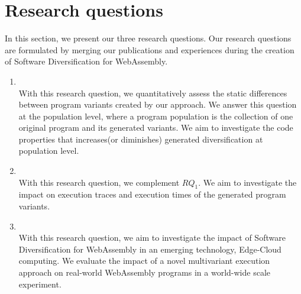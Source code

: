 

\section{Research questions}
\label{intro:definition:rq}

In this section, we present our three research questions. Our research questions are formulated by merging our publications and experiences during the creation of Software Diversification for WebAssembly. 

\begin{enumerate}[label=\subscript{RQ}{{\arabic*}}]
    \item \textbf{\rqone}\\
    With this research question, we quantitatively assess the static differences between program variants created by our approach. We answer this question at the population level, where a program population is the collection of one original program and its generated variants. We aim to investigate the code properties that increases(or diminishes) generated diversification at population level. 

    \item \textbf{\rqtwo} \\
    With this research question, we complement $RQ_1$. We aim to investigate the impact on execution traces and execution times of the generated program variants.

    \item \textbf{\rqthree} \\
    With this research question, we aim to investigate the impact of Software Diversification for WebAssembly in an emerging technology, Edge-Cloud computing. We evaluate the impact of a novel multivariant execution approach on real-world WebAssembly programs in a world-wide scale experiment.
    
    
\end{enumerate}


\renewcommand{\rqone}{$RQ_1$. To what extent can we artifically generate program variants for WebAssembly?}


